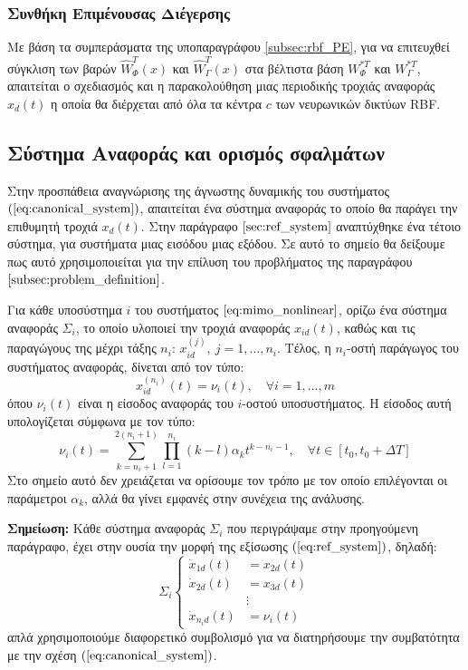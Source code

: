 \subsubsection{Συνθήκη Επιμένουσας Διέγερσης}
Με βάση τα συμπεράσματα της υποπαραγράφου \ref{subsec:rbf_PE}, για να επιτευχθεί σύγκλιση των βαρών $\hat{W}_{\varPhi}^{T}(x)$ και $\hat{W}_{\Gamma}^{T}(x)$ στα βέλτιστα βάση $W_{\varPhi}^{*T}$ και $W_{\Gamma}^{*T}$, απαιτείται ο σχεδιασμός και η παρακολούθηση μιας περιοδικής τροχιάς αναφοράς $x_d(t)$ η οποία θα διέρχεται από όλα τα κέντρα $c$ των νευρωνικών δικτύων RBF.

\subsection{Σύστημα Αναφοράς και ορισμός σφαλμάτων}
Στην προσπάθεια αναγνώρισης της άγνωστης δυναμικής του συστήματος $(\ref{eq:canonical_system})$, απαιτείται ένα σύστημα αναφοράς το οποίο θα παράγει την επιθυμητή τροχιά $x_d(t)$. Στην παράγραφο $\ref{sec:ref_system}$ αναπτύχθηκε ένα τέτοιο σύστημα, για συστήματα μιας εισόδου μιας εξόδου. Σε αυτό το σημείο θα δείξουμε πως αυτό χρησιμοποιείται για την επίλυση του προβλήματος της παραγράφου $\ref{subsec:problem_definition}$.

Για κάθε υποσύστημα $i$ του συστήματος $\ref{eq:mimo_nonlinear}$, ορίζω ένα σύστημα αναφοράς $\Sigma_i$, το οποίο υλοποιεί την τροχιά αναφοράς $x_{id}(t)$, καθώς και τις παραγώγους της μέχρι τάξης $n_i$: $x_{id}^{(j)},\: j = 1,\dots,n_i$. Τέλος, η $n_i$-οστή παράγωγος του συστήματος αναφοράς, δίνεται από τον τύπο:
\begin{equation}
	x_{id}^{(n_i)}(t) = \nu_i(t), \quad \forall i = 1,\dots,m
\end{equation}
όπου $\nu_i(t)$ είναι η είσοδος αναφοράς του $i$-οστού υποσυστήματος. Η είσοδος αυτή υπολογίζεται σύμφωνα με τον τύπο:
\begin{equation}
	\nu_i(t) = \sum_{k=n_i + 1}^{2(n_i + 1)} \prod_{l = 1}^{n_i} (k-l) \alpha_k t^{k - n_i - 1}
	,\quad \forall t \in [t_0,t_0+\Delta T]
\end{equation}
Στο σημείο αυτό δεν χρειάζεται να ορίσουμε τον τρόπο με τον οποίο επιλέγονται οι παράμετροι $\alpha_k$, αλλά θα γίνει εμφανές στην συνέχεια της ανάλυσης.


\textbf{Σημείωση:} Κάθε σύστημα αναφοράς $\Sigma_i$ που περιγράψαμε στην προηγούμενη παράγραφο, έχει στην ουσία την μορφή της εξίσωσης $(\ref{eq:ref_system})$, δηλαδή:
\begin{equation*}
\Sigma_i
\begin{cases}
\dot{x}_{1d}(t) &= x_{2d}(t)  \\
\dot{x}_{2d}(t) &= x_{3d}(t) \\
                & \vdots \\
\dot{x}_{n_i d}(t) &= \nu_i(t)
\end{cases}
\label{eq:ref_subsystem}
\end{equation*}
απλά χρησιμοποιούμε διαφορετικό συμβολισμό για να διατηρήσουμε την συμβατότητα με την σχέση $(\ref{eq:canonical_system})$.

